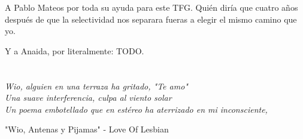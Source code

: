 \par A Pablo Mateos por toda su ayuda para este TFG. Quién diría que cuatro años después de que la selectividad nos separara fueras a elegir el mismo camino que yo.




\par Y a Anaida, por literalmente: TODO. 
\cleardoublepage %
\chapter*{}
\setlength{\leftmargin}{0.5\textwidth}
\setlength{\parsep}{0cm}
\addtolength{\topsep}{0.5cm}
\begin{flushright}
\small\em{
Wio, alguien en una terraza ha gritado, "Te amo"\\
Una suave interferencia, culpa al viento solar\\
Un poema embotellado que en estéreo ha aterrizado en mi inconsciente,\\}
\end{flushright}


\begin{flushright}
\small{
"Wio, Antenas y Pijamas" - Love Of Lesbian
}
\end{flushright}


\cleardoublepage %

